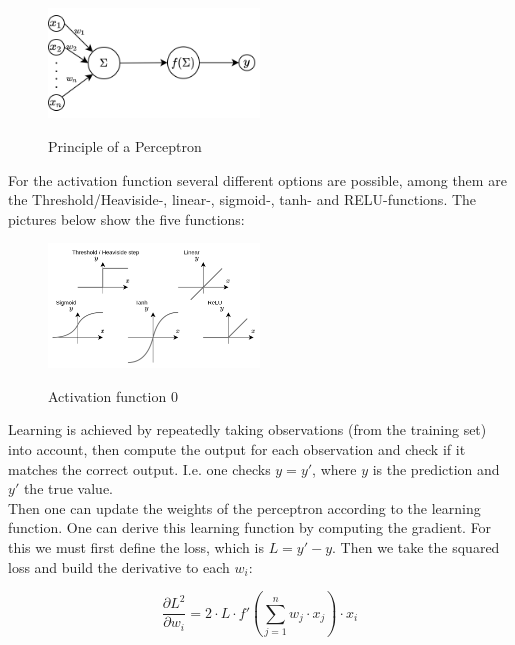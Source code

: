 \documentclass[12pt,a4paper]{article}
\begin{document}
\begin{figure}[ht]
    \begin{center}
    \includegraphics[width=0.5\textwidth]{imgs/perceptron.png}
    \label{fig:perceptron}
    \caption{Principle of a Perceptron}
    \end{center}
\end{figure}

\noindent For the activation function several different options are possible, among them are the Threshold/Heaviside-, linear-, sigmoid-, tanh- and RELU-functions. The pictures below show the five functions:

\begin{figure}[ht]
    \begin{center}
    \includegraphics[width=0.5\textwidth]{imgs/perceptron_af.png}
    \label{fig:perceptron_af_0}
    \caption{Activation function 0}
    \end{center}
\end{figure}

\noindent Learning is achieved by repeatedly taking observations (from the training set) into account, then compute the output for each observation and check if it matches the correct output. I.e. one checks \(y = y'\), where \(y\) is the prediction and \(y'\) the true value.\\
Then one can update the weights of the perceptron according to the learning function. One can derive this learning function by computing the gradient. For this we must first define the loss, which is \(L = y' - y\). Then we take the squared loss and build the derivative to each \(w_i\):

\[\frac{\partial L^2}{\partial w_i} = 2 \cdot L \cdot f'(\sum_{j = 1}^n w_j \cdot x_j) \cdot x_i\]
\end{document}
